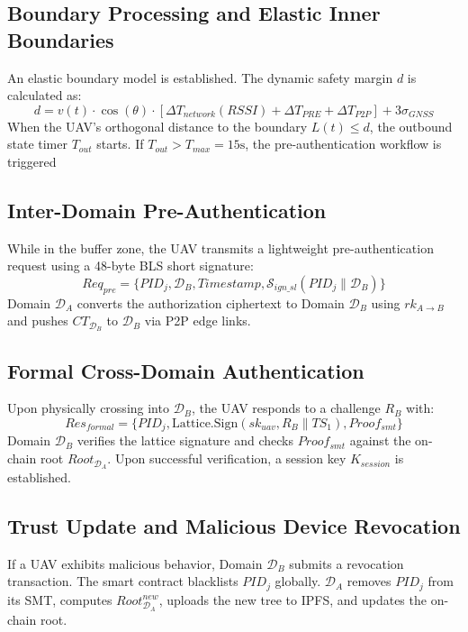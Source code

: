 \documentclass[lettersize,journal]{IEEEtran}
\begin{document}
\subsection{Boundary Processing and Elastic Inner Boundaries}
An elastic boundary model is established. The dynamic safety margin $d$ is calculated as:
\begin{equation}
d = v(t) \cdot \cos(\theta) \cdot \left[ \Delta T_{network}(RSSI) + \Delta T_{PRE} + \Delta T_{P2P} \right] + 3\sigma_{GNSS}
\end{equation}
When the UAV's orthogonal distance to the boundary $L(t) \le d$, the outbound state timer $T_{out}$ starts. If $T_{out} > T_{max} = 15\text{s}$, the pre-authentication workflow is triggered
\subsection{Inter-Domain Pre-Authentication}
While in the buffer zone, the UAV transmits a lightweight pre-authentication request using a 48-byte BLS short signature:
\begin{equation}
Req_{pre} = \{PID_j, \mathcal{D}_B, Timestamp, \mathcal{S}_{ign\_sl}(PID_j \parallel \mathcal{D}_B)\}
\end{equation}
Domain $\mathcal{D}_A$ converts the authorization ciphertext to Domain $\mathcal{D}_B$ using $rk_{A \to B}$ and pushes $CT_{\mathcal{D}_B}$ to $\mathcal{D}_B$ via P2P edge links.
\subsection{Formal Cross-Domain Authentication}
Upon physically crossing into $\mathcal{D}_B$, the UAV responds to a challenge $R_B$ with:
\begin{equation}
Res_{formal} = \{PID_j, \text{Lattice.Sign}(sk_{uav}, R_B \parallel TS_1), Proof_{smt}\}
\end{equation}
Domain $\mathcal{D}_B$ verifies the lattice signature and checks $Proof_{smt}$ against the on-chain root $Root_{\mathcal{D}_A}$. Upon successful verification, a session key $K_{session}$ is established.
\subsection{Trust Update and Malicious Device Revocation}
If a UAV exhibits malicious behavior, Domain $\mathcal{D}_B$ submits a revocation transaction. The smart contract blacklists $PID_j$ globally. $\mathcal{D}_A$ removes $PID_j$ from its SMT, computes $Root_{\mathcal{D}_A}^{new}$, uploads the new tree to IPFS, and updates the on-chain root.
\end{document}
